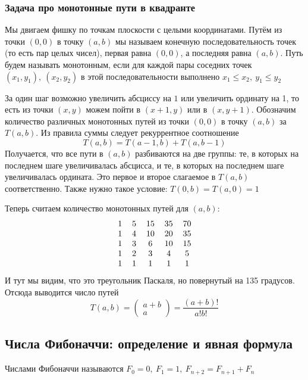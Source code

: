 \documentclass[a4paper]{article}
\begin{document}
\subsubsection*{Задача про монотонные пути в квадранте}
Мы двигаем фишку по точкам плоскости с целыми координатами. Путём из точки $(0,0)$ в точку $(a, b)$ мы называем конечную последовательность точек (то есть пар целых чисел), первая равна $(0,0)$, а последняя равна $(a,b)$. Путь будем называть монотонным, если для каждой пары соседних точек $(x_1, y_1),\ (x_2, y_2)$ в этой последовательности выполнено $x_1\leqslant x_2,\ y_1\leqslant y_2$

За один шаг возможно увеличить абсциссу на $1$ или увеличить ординату на 1, то есть из точки $(x, y)$ можем пойти в $(x + 1, y)$ или в $(x, y + 1)$. Обозначим количество различных монотонных путей из точки $(0, 0)$ в точку $(a, b)$ за $T(a, b)$. Из правила суммы следует рекуррентное соотношение
\label{sec:1.37.1}\begin{equation*}
    T(a,b)=T(a-1,b)+T(a,b-1)
\end{equation*}
Получается, что все пути в $(a, b)$ разбиваются на две группы: те, в которых на последнем шаге увеличивалась абсцисса, и те, в которых на последнем шаге увеличивалась ордината. Это первое и второе слагаемое в $T(a,b)$ соответственно. Также нужно такое условие: $T(0,b)=T(a,0)=1$

Теперь считаем количество монотонных путей для $(a,b):$
\begin{equation*}
    \begin{tabular}{ccccc}
        1& 5 &15  &35  &70 \\
       1 &4  &10  &20  &35 \\
        1& 3 &6  &10  &15 \\
        1& 2 &3  &4  &5 \\
        1& 1 & 1 & 1 &1 \\
   \end{tabular}
\end{equation*}
И тут мы видим, что это треугольник Паскаля, но повернутый на 135 градусов. Отсюда выводится число путей 
\begin{equation*}
    T(a,b)=\begin{pmatrix}
        a+b\\
        a
    \end{pmatrix}=\frac{(a+b)!}{a!b!}
\end{equation*}

\subsection{Числа Фибоначчи: определение и явная формула}
 Числами Фибоначчи называются $F_0=0,\ F_1=1,\ F_{n+2}=F_{n+1}+F_n$
\end{document}
